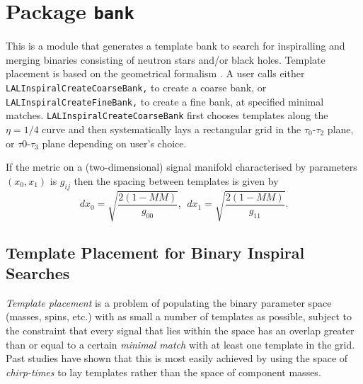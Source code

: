 \chapter{Package \texttt{bank}}

This is a module that generates a template bank to search for
inspiralling and merging binaries consisting of neutron stars
and/or black holes. Template placement is based on the geometrical
formalism \cite{Owen:96,OwenAndSathyaprakash:99}.  A user 
calls either \texttt{LALInspiralCreateCoarseBank,} 
to create a coarse bank, or \texttt{LALInspiralCreateFineBank,} 
to create a fine bank, at specified minimal matches.  
\texttt{LALInspiralCreateCoarseBank} first chooses templates
along the $\eta=1/4$ curve and then systematically lays a 
rectangular grid in the $\tau_0$-$\tau_2$ plane, or $\tau0$-$\tau_3$
plane depending on user's choice.

If the metric on a (two-dimensional) signal manifold characterised 
by parameters $(x_0,x_1)$ is $g_{ij}$ then the spacing between templates 
is given by
\begin{equation}
   dx_0 = \sqrt{ \frac{2(1 -MM)}{g_{00}} },\ \ 
   dx_1 = \sqrt{ \frac{2(1 -MM)}{g_{11}} }.
\end{equation}
 
\section{Template Placement for Binary Inspiral Searches}
{\it Template placement} is a problem of populating the binary 
parameter space (masses, spins, etc.) with as small a number of 
templates as possible, subject to the constraint that every signal 
that lies within the space has an overlap greater 
than or equal to a certain {\it minimal match} with at least one template in 
the grid. Past studies \cite {Sathyaprakash and Dhurandhar 1991, Sathyaprakash 1994, OwenAndSathyaprakash:99}
have shown that this is most easily achieved by using the space of
{\it chirp-times} to lay templates rather than the space of component masses. 

